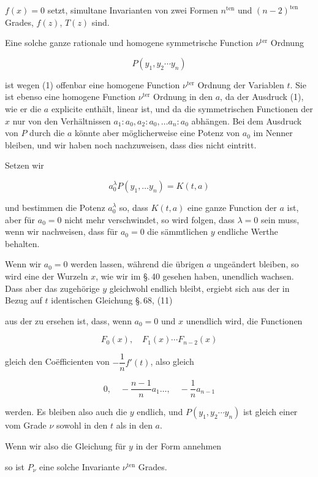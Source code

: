 $f(x) = 0$ setzt, simultane Invarianten von zwei Formen $n^{\text{ten}}$ und
$(n-2)^{\text{ten}}$ Grades, $f(z)$, $T(z)$ sind.

Eine solche ganze rationale und homogene symmetrische
Function $\nu^{\text{ter}}$ Ordnung

\[
P(y_1, y_2 \cdots y_n)
\]

ist wegen (1) offenbar eine homogene Function $\nu^{\text{ter}}$ Ordnung der
Variablen $t$. Sie ist ebenso eine homogene Function $\nu^{\text{ter}}$ Ordnung
 in den $a$, da der Ausdruck (1), wie er die $a$ explicite enth\"alt,
linear ist, und da die symmetrischen Functionen der $x$ nur
von den Verh\"altnissen $a_1 : a_0, a_2 : a_0, \ldots a_n : a_0$ abh\"angen. Bei dem
Ausdruck von $P$ durch die $a$ k\"onnte aber m\"oglicherweise eine
Potenz von $a_0$ im Nenner bleiben, und wir haben noch nachzuweisen,
dass dies nicht eintritt.

Setzen wir

\[
a_0^{\lambda} P(y_1, \ldots y_n) = K(t, a)
\]

und bestimmen die Potenz $a_0^{\lambda}$ so, dass $K(t, a)$ eine ganze Function
 der $a$ ist, aber f\"ur $a_0 = 0$ nicht mehr verschwindet, so
wird folgen, dass $\lambda = 0$ sein muss, wenn wir nachweisen, dass f\"ur
$a_0 = 0$ die s\"ammtlichen $y$ endliche Werthe behalten.

Wenn wir $a_0 = 0$ werden lassen, w\"ahrend die \"ubrigen $a$
unge\"andert bleiben, so wird eine der Wurzeln $x$, wie wir im
\S.\,40 gesehen haben, unendlich wachsen. Dass aber das zugeh\"orige
$y$ gleichwohl endlich bleibt, ergiebt sich aus der in Bezug auf
$t$ identischen Gleichung \S.\,68, (11)


aus der zu ersehen ist, dass, wenn $a_0 = 0$ und $x$ unendlich wird,
die Functionen

\[
F_0(x), \quad F_1(x) \cdots F_{n-2}(x)
\]

gleich den Co\"efficienten von $-\dfrac{1}{n}f'(t)$, also gleich

\[
0, \quad -\frac{n-1}{n}a_1 \ldots, \quad -\frac{1}{n}a_{n-1}
\]

werden. Es bleiben also auch die $y$ endlich, und $P(y_1, y_2 \cdots y_n)$
ist gleich einer  vom Grade $\nu$
sowohl in den $t$ als in den $a$.

Wenn wir also die Gleichung f\"ur $y$ in der Form annehmen


so ist $P_{\nu}$ eine solche Invariante $\nu^{\text{ten}}$ Grades.
